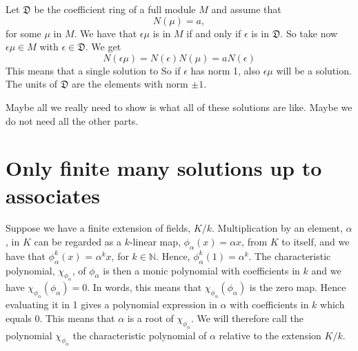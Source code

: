 \documentclass{article}
\newcommand{\mfrak}[1]{\mathfrak{#1}}
\newcommand{\mbb}[1]{\mathbb{#1}}
\begin{document}
Let $\mfrak{D}$ be the coefficient ring of a full module $M$ and assume that 
$$N(\mu) = a,$$
for some $\mu$ in $M$. We have that $\epsilon \mu$ is in $M$ if and only if  $\epsilon$ is in $\mfrak{D}$. So take now $\epsilon \mu \in M$ with $\epsilon \in \mfrak{D}$. We get
$$N(\epsilon \mu) = N(\epsilon)N(\mu) = a N(\epsilon)$$
This means that a single solution to 
So if $\epsilon$ has norm 1, also $\epsilon \mu$ will be a solution. The units of $\mfrak{D}$ are the elements with norm $\pm 1$. 

Maybe all we really need to show is what all of these solutions are like. Maybe we do not need all the other parts. 




\section*{Only finite many solutions up to associates}


Suppose we have a finite extension of fields, $K / k$. Multiplication by an element, $\alpha$, in $K$ can be regarded as a $k$-linear map, $\phi_\alpha(x) = \alpha x$, from $K$ to itself, and we have that $\phi_\alpha^k(x)$ = $\alpha^k x$, for $k \in \mbb N$. Hence, $\phi_\alpha^k(1) = \alpha^k$. The characteristic polynomial, $\chi_{\phi_\alpha}$, of $\phi_\alpha$ is then a monic polynomial with coefficients in $k$ and we have $\chi_{\phi_\alpha}(\phi_\alpha) = 0$. In words, this means that $\chi_{\phi_\alpha}(\phi_\alpha)$ is the zero map. Hence evaluating it in 1 gives a polynomial expression in $\alpha$ with coefficients in $k$ which equals 0. This means that $\alpha$ is a root of $\chi_{\phi_\alpha}$. We will therefore call the polynomial $\chi_{\phi_\alpha}$ the characteristic polynomial of $\alpha$ relative to the extension $K / k$.
\end{document}
